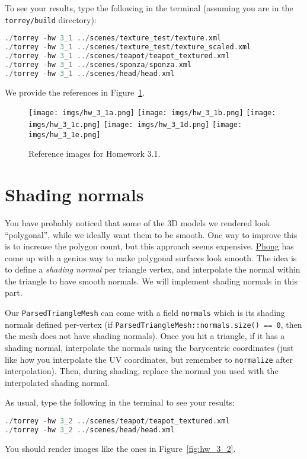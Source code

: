 To see your results, type the following in the terminal (assuming you are in the \lstinline{torrey/build} directory):
\begin{lstlisting}[language=C++]
./torrey -hw 3_1 ../scenes/texture_test/texture.xml
./torrey -hw 3_1 ../scenes/texture_test/texture_scaled.xml
./torrey -hw 3_1 ../scenes/teapot/teapot_textured.xml
./torrey -hw 3_1 ../scenes/sponza/sponza.xml
./torrey -hw 3_1 ../scenes/head/head.xml
\end{lstlisting}
We provide the references in Figure~\ref{fig:hw_3_1}.

\begin{figure}[ht]
    \centering
    \texttt{[image: imgs/hw\_3\_1a.png]}
    \texttt{[image: imgs/hw\_3\_1b.png]}
    \texttt{[image: imgs/hw\_3\_1c.png]}
    \texttt{[image: imgs/hw\_3\_1d.png]}
    \texttt{[image: imgs/hw\_3\_1e.png]}
    \caption{Reference images for Homework 3.1.}
    \label{fig:hw_3_1}
\end{figure}

\section{Shading normals}
You have probably noticed that some of the 3D models we rendered look ``polygonal'', while we ideally want them to be smooth. One way to improve this is to increase the polygon count, but this approach seems expensive. \href{https://en.wikipedia.org/wiki/Phong_shading}{Phong} has come up with a genius way to make polygonal surfaces look smooth. The idea is to define a \emph{shading normal} per triangle vertex, and interpolate the normal within the triangle to have smooth normals. We will implement shading normals in this part.

Our \lstinline{ParsedTriangleMesh} can come with a field \lstinline{normals} which is its shading normals defined per-vertex (if \lstinline{ParsedTriangleMesh::normals.size() == 0}, then the mesh does not have shading normals). Once you hit a triangle, if it has a shading normal, interpolate the normals using the barycentric coordinates (just like how you interpolate the UV coordinates, but remember to \lstinline{normalize} after interpolation). Then, during shading, replace the normal you used with the interpolated shading normal.

As usual, type the following in the terminal to see your results:
\begin{lstlisting}[language=C++]
./torrey -hw 3_2 ../scenes/teapot/teapot_textured.xml
./torrey -hw 3_2 ../scenes/head/head.xml
\end{lstlisting}
You should render images like the ones in Figure~\ref{fig:hw_3_2}.

